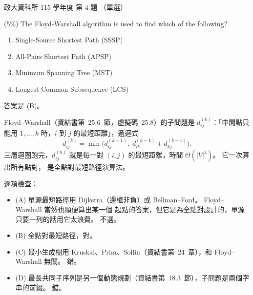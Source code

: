 \begin{pastexam}[label={px:nccu-115-dsa-04}]{政大資科所 115 學年度 第 4 題}
（單選）

(5\%) The Floyd-Warshall algorithm is used to find which of the following?
\begin{enumerate}[label=(\Alph*)]
\item Single-Source Shortest Path (SSSP)
\item All-Pairs Shortest Path (APSP)
\item Minimum Spanning Tree (MST)
\item Longest Common Subsequence (LCS)
\end{enumerate}
\end{pastexam}

\begin{pastsoln}
答案是 (B)。

Floyd--Warshall（資結書第~25.6~節，虛擬碼~25.8）的子問題是 $d^{(k)}_{ij}$：「中間點只能用
$1, \ldots, k$ 時，$i$ 到 $j$ 的最短距離」，遞迴式
\[
d^{(k)}_{ij} = \min\bigl(d^{(k-1)}_{ij},\; d^{(k-1)}_{ik} + d^{(k-1)}_{kj}\bigr).
\]
三層迴圈跑完，$d^{(n)}_{ij}$ 就是每一對 $(i, j)$ 的最短距離，時間 $\Theta(|V|^3)$。 它一次算出所有點對，
是全點對最短路徑演算法。

逐項檢查：
\begin{itemize}
\item (A) 單源最短路徑用 Dijkstra（邊權非負）或 Bellman--Ford。 Floyd--Warshall 當然也順便算出某一個
起點的答案，但它是為全點對設計的，單源只要一列的話用它太浪費。 不選。
\item (B) 全點對最短路徑，對。
\item (C) 最小生成樹用 Kruskal、Prim、Sollin（資結書第~24~章），和 Floyd--Warshall 無關。 錯。
\item (D) 最長共同子序列是另一個動態規劃（資結書第~18.3~節），子問題是兩個字串的前綴。 錯。
\end{itemize}
\end{pastsoln}
